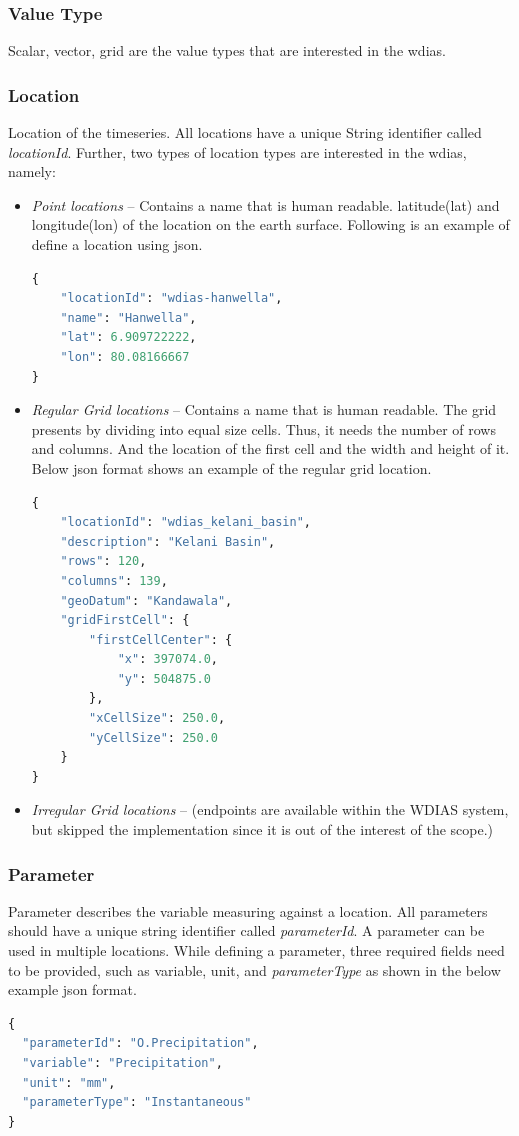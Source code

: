 \subsubsection{Value Type}
Scalar, vector, grid are the value types that are interested in the \acrshort{wdias}.

\subsubsection{Location}
Location of the timeseries. All locations have a unique String identifier called \emph{locationId}. Further, two types of location types are interested in the \acrshort{wdias}, namely:
\begin{itemize}
  \item \emph{Point locations} -- Contains a name that is human readable. latitude(lat) and longitude(lon) of the location on the earth surface. Following is an example of define a location using \acrfull{json}.
\begin{lstlisting}[language=Python]
{
    "locationId": "wdias-hanwella",
    "name": "Hanwella",
    "lat": 6.909722222,
    "lon": 80.08166667
}
\end{lstlisting}
  \item \emph{Regular Grid locations} -- Contains a name that is human readable. The grid presents by dividing into equal size cells. Thus, it needs the number of rows and columns. 
  And the location of the first cell and the width and height of it. Below \acrshort{json} format shows an example of the regular grid location. 
\begin{lstlisting}[language=Python]
{
    "locationId": "wdias_kelani_basin",
    "description": "Kelani Basin",
    "rows": 120,
    "columns": 139,
    "geoDatum": "Kandawala",
    "gridFirstCell": {
        "firstCellCenter": {
            "x": 397074.0,
            "y": 504875.0
        },
        "xCellSize": 250.0,
        "yCellSize": 250.0
    }
}
\end{lstlisting}
  \item \emph{Irregular Grid locations} -- (endpoints are available within the WDIAS system, but skipped the implementation since it is out of the interest of the scope.)
\end{itemize}

\subsubsection{Parameter}
Parameter describes the variable measuring against a location. All parameters should have a unique string identifier called \emph{parameterId}. A parameter can be used in multiple locations. While defining a parameter, three required fields need to be provided, such as variable, unit, and \emph{parameterType} as shown in the below example \acrshort{json} format.
\begin{lstlisting}[language=Python]
{
  "parameterId": "O.Precipitation",
  "variable": "Precipitation",
  "unit": "mm",
  "parameterType": "Instantaneous"
}
\end{lstlisting}

